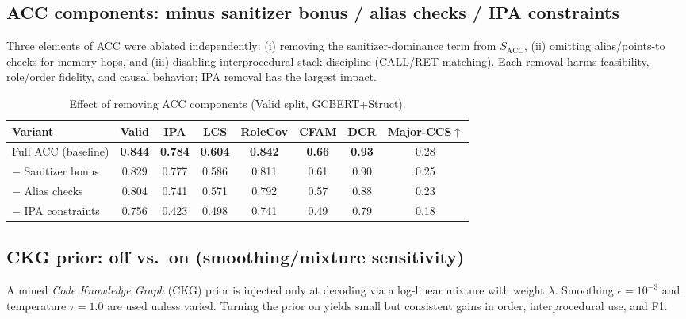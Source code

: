 \documentclass{buthesis}
\begin{document}
\subsection{ACC components: minus sanitizer bonus / alias checks / IPA constraints}
\label{subsec:ablate-acc}

Three elements of ACC were ablated independently: (i) removing the sanitizer-dominance term from $S_{\mathrm{ACC}}$, (ii) omitting alias/points-to checks for memory hops, and (iii) disabling interprocedural stack discipline (CALL/RET matching). Each removal harms feasibility, role/order fidelity, and causal behavior; IPA removal has the largest impact.

\begin{table}[H]
\centering
\small
\setlength{\tabcolsep}{6pt}
\renewcommand{\arraystretch}{1.10}
\caption{Effect of removing ACC components (Valid split, GCBERT{+}Struct).}
\label{tab:ablate-acc}
\begin{tabular}{l c c c c c c c}
\toprule
\textbf{Variant} & Valid & IPA & LCS & RoleCov & CFAM & DCR & Major-CCS$\uparrow$ \\
\midrule
Full ACC (baseline)        & \textbf{0.844} & \textbf{0.784} & \textbf{0.604} & \textbf{0.842} & \textbf{0.66} & \textbf{0.93} & 0.28 \\
$-$ Sanitizer bonus        & 0.829 & 0.777 & 0.586 & 0.811 & 0.61 & 0.90 & 0.25 \\
$-$ Alias checks           & 0.804 & 0.741 & 0.571 & 0.792 & 0.57 & 0.88 & 0.23 \\
$-$ IPA constraints        & 0.756 & 0.423 & 0.498 & 0.741 & 0.49 & 0.79 & 0.18 \\
\bottomrule
\end{tabular}
\end{table}

\subsection{CKG prior: off vs.\ on (smoothing/mixture sensitivity)}
\label{subsec:ablate-ckg}

A mined \emph{Code Knowledge Graph} (CKG) prior is injected only at decoding via a log-linear mixture with weight $\lambda$. Smoothing $\epsilon{=}10^{-3}$ and temperature $\tau{=}1.0$ are used unless varied. Turning the prior on yields small but consistent gains in order, interprocedural use, and F1.
\end{document}
